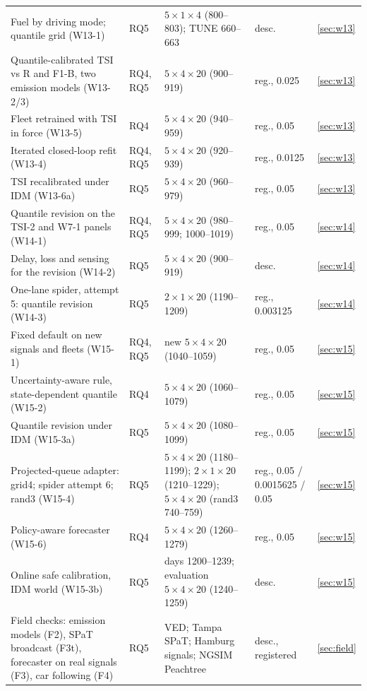\begin{table}[t]
\begin{tabular}{@{}p{5.3cm}p{1.5cm}p{6.0cm}p{2.5cm}l@{}}
Fuel by driving mode; quantile grid (W13-1) & RQ5 & $5\times1\times4$ (800--803); TUNE 660--663 & desc. & \ref{sec:w13}\\
Quantile-calibrated TSI vs R and F1-B, two emission models (W13-2/3) & RQ4, RQ5 & $5\times4\times20$ (900--919) & reg., 0.025 & \ref{sec:w13}\\
Fleet retrained with TSI in force (W13-5) & RQ4 & $5\times4\times20$ (940--959) & reg., 0.05 & \ref{sec:w13}\\
Iterated closed-loop refit (W13-4) & RQ4, RQ5 & $5\times4\times20$ (920--939) & reg., 0.0125 & \ref{sec:w13}\\
TSI recalibrated under IDM (W13-6a) & RQ5 & $5\times4\times20$ (960--979) & reg., 0.05 & \ref{sec:w13}\\
Quantile revision on the TSI-2 and W7-1 panels (W14-1) & RQ4, RQ5 & $5\times4\times20$ (980--999; 1000--1019) & reg., 0.05 & \ref{sec:w14}\\
Delay, loss and sensing for the revision (W14-2) & RQ5 & $5\times4\times20$ (900--919) & desc. & \ref{sec:w14}\\
One-lane spider, attempt 5: quantile revision (W14-3) & RQ5 & $2\times1\times20$ (1190--1209) & reg., 0.003125 & \ref{sec:w14}\\
Fixed default on new signals and fleets (W15-1) & RQ4, RQ5 & new $5\times4\times20$ (1040--1059) & reg., 0.05 & \ref{sec:w15}\\
Uncertainty-aware rule, state-dependent quantile (W15-2) & RQ4 & $5\times4\times20$ (1060--1079) & reg., 0.05 & \ref{sec:w15}\\
Quantile revision under IDM (W15-3a) & RQ5 & $5\times4\times20$ (1080--1099) & reg., 0.05 & \ref{sec:w15}\\
Projected-queue adapter: grid4; spider attempt 6; rand3 (W15-4) & RQ5 & $5\times4\times20$ (1180--1199); $2\times1\times20$ (1210--1229); $5\times4\times20$ (rand3 740--759) & reg., 0.05 / 0.0015625 / 0.05 & \ref{sec:w15}\\
Policy-aware forecaster (W15-6) & RQ4 & $5\times4\times20$ (1260--1279) & reg., 0.05 & \ref{sec:w15}\\
Online safe calibration, IDM world (W15-3b) & RQ5 & days 1200--1239; evaluation $5\times4\times20$ (1240--1259) & desc. & \ref{sec:w15}\\
Field checks: emission models (F2), SPaT broadcast (F3t), forecaster on real signals (F3), car following (F4) & RQ5 & VED; Tampa SPaT; Hamburg signals; NGSIM Peachtree & desc., registered & \ref{sec:field}\\

\end{tabular}
\end{table}
